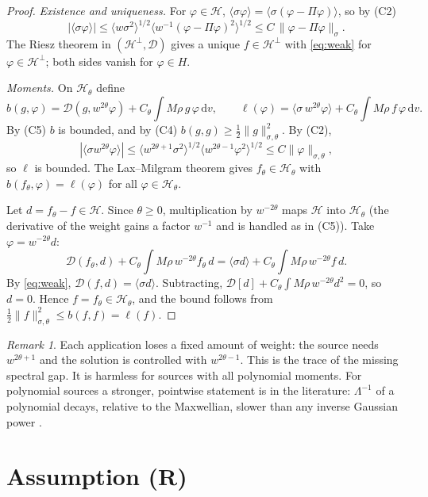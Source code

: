 \documentclass[11pt]{article}
\newcommand{\dd}{\mathrm{d}}
\newcommand{\cD}{\mathcal{D}}
\newcommand{\cH}{\mathcal{H}}
\newcommand{\avg}[1]{\langle #1\rangle}
\theoremstyle{remark}
\newtheorem{remark}[theorem]{Remark}
\begin{document}
\begin{proof}
\emph{Existence and uniqueness.} For $\varphi\in\cH$,
$\avg{\sigma\varphi}=\avg{\sigma(\varphi-\Pi\varphi)}$, so by (C2)
\[
  |\avg{\sigma\varphi}|\le\avg{w\sigma^2}^{1/2}
  \avg{w^{-1}(\varphi-\Pi\varphi)^2}^{1/2}\le C\,\|\varphi-\Pi\varphi\|_\sigma .
\]
The Riesz theorem in $(\cH^\perp,\cD)$ gives a unique $f\in\cH^\perp$ with
\eqref{eq:weak} for $\varphi\in\cH^\perp$; both sides vanish for
$\varphi\in H$.

\emph{Moments.} On $\cH_\theta$ define
\[
  b(g,\varphi)=\cD(g,w^{2\theta}\varphi)+C_\theta\int M\rho\,g\,\varphi\,\dd v,
  \qquad
  \ell(\varphi)=\avg{\sigma\,w^{2\theta}\varphi}
  +C_\theta\int M\rho\,f\,\varphi\,\dd v .
\]
By (C5) $b$ is bounded, and by (C4) $b(g,g)\ge\tfrac12\|g\|^2_{\sigma,\theta}$.
By (C2),
\[
  |\avg{\sigma w^{2\theta}\varphi}|\le\avg{w^{2\theta+1}\sigma^2}^{1/2}
  \avg{w^{2\theta-1}\varphi^2}^{1/2}\le C\|\varphi\|_{\sigma,\theta},
\]
so $\ell$ is bounded. The Lax--Milgram theorem gives $f_\theta\in\cH_\theta$ with
$b(f_\theta,\varphi)=\ell(\varphi)$ for all $\varphi\in\cH_\theta$.

Let $d=f_\theta-f\in\cH$. Since $\theta\ge0$, multiplication by $w^{-2\theta}$
maps $\cH$ into $\cH_\theta$ (the derivative of the weight gains a factor
$w^{-1}$ and is handled as in (C5)). Take $\varphi=w^{-2\theta}d$:
\[
  \cD(f_\theta,d)+C_\theta\int M\rho\,w^{-2\theta}f_\theta\,d
  =\avg{\sigma d}+C_\theta\int M\rho\,w^{-2\theta}f\,d .
\]
By \eqref{eq:weak}, $\cD(f,d)=\avg{\sigma d}$. Subtracting,
$\cD[d]+C_\theta\int M\rho\,w^{-2\theta}d^2=0$, so $d=0$. Hence
$f=f_\theta\in\cH_\theta$, and the bound follows from
$\tfrac12\|f\|^2_{\sigma,\theta}\le b(f,f)=\ell(f)$.
\end{proof}

\begin{remark}
Each application loses a fixed amount of weight: the source needs
$w^{2\theta+1}$ and the solution is controlled with $w^{2\theta-1}$. This is
the trace of the missing spectral gap. It is harmless for sources with all
polynomial moments. For polynomial sources a stronger, pointwise statement
is in the literature: $\Lambda^{-1}$ of a polynomial decays, relative to the
Maxwellian, slower than any inverse Gaussian power
\cite[Lemma~6.2]{DYY}.
\end{remark}

\section{Assumption (R)}
\end{document}
